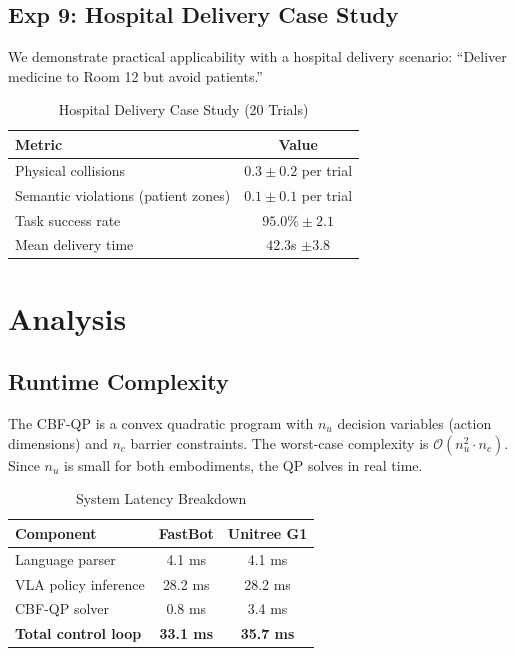 \documentclass[conference]{IEEEtran}
\begin{document}
\subsection{Exp 9: Hospital Delivery Case Study}
We demonstrate practical applicability with a hospital delivery scenario: ``Deliver medicine to Room 12 but avoid patients.''

\begin{table}[h]
\centering
\caption{Hospital Delivery Case Study (20 Trials)}
\begin{tabular}{lc}
\toprule
\textbf{Metric} & \textbf{Value} \\
\midrule
Physical collisions & $0.3 \pm 0.2$ per trial \\
Semantic violations (patient zones) & $0.1 \pm 0.1$ per trial \\
Task success rate & $95.0\% \pm 2.1$ \\
Mean delivery time & $42.3$s $\pm 3.8$ \\
\bottomrule
\end{tabular}
\end{table}

\section{Analysis}

\subsection{Runtime Complexity}
The CBF-QP is a convex quadratic program with $n_u$ decision variables (action dimensions) and $n_c$ barrier constraints. The worst-case complexity is $\mathcal{O}(n_u^2 \cdot n_c)$. Since $n_u$ is small for both embodiments, the QP solves in real time.

\begin{table}[h]
\centering
\caption{System Latency Breakdown}
\begin{tabular}{lcc}
\toprule
\textbf{Component} & \textbf{FastBot} & \textbf{Unitree G1} \\
\midrule
Language parser & 4.1 ms & 4.1 ms \\
VLA policy inference & 28.2 ms & 28.2 ms \\
CBF-QP solver & 0.8 ms & 3.4 ms \\
\midrule
\textbf{Total control loop} & \textbf{33.1 ms} & \textbf{35.7 ms} \\
\bottomrule
\end{tabular}
\end{table}
\end{document}
